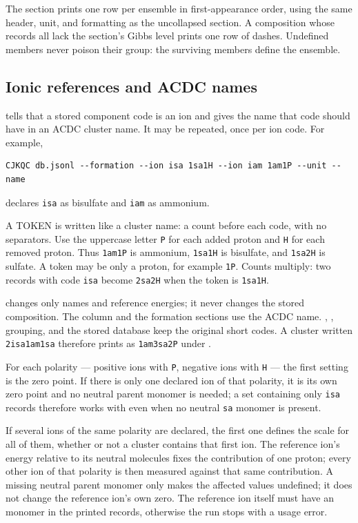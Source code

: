 The section prints one row per ensemble in first-appearance order, using the
same header, unit, and formatting as the uncollapsed section. A composition
whose records all lack the section's Gibbs level prints one row of dashes.
Undefined members never poison their group: the surviving members define the
ensemble.

\subsection{Ionic references and ACDC names}\label{sec:ion-references}

 tells \CJKQC{} that a stored component code is an
ion and gives the name that code should have in an ACDC cluster name. It may
be repeated, once per ion code. For example,

\begin{verbatim}
CJKQC db.jsonl --formation --ion isa 1sa1H --ion iam 1am1P --unit --name
\end{verbatim}

declares \texttt{isa} as bisulfate and \texttt{iam} as ammonium.

A TOKEN is written like a cluster name: a count before each code, with no
separators. Use the uppercase letter \texttt{P} for each added proton and
\texttt{H} for each removed proton. Thus \texttt{1am1P} is ammonium,
\texttt{1sa1H} is bisulfate, and \texttt{1sa2H} is sulfate. A token may be
only a proton, for example \texttt{1P}. Counts multiply: two records with
code \texttt{isa} become \texttt{2sa2H} when the token is
\texttt{1sa1H}.

 changes only names and reference energies; it never changes the
stored composition. The  column and the formation sections use
the ACDC name. , , grouping, and the
stored database keep the original short codes. A cluster written
\texttt{2isa1am1sa} therefore prints as \texttt{1am3sa2P} under
.

For each polarity — positive ions with \texttt{P}, negative ions with
\texttt{H} — the first  setting is the zero point. If there is
only one declared ion of that polarity, it is its own zero point and no
neutral parent monomer is needed; a set containing only \texttt{isa}
records therefore works with  even when no neutral
\texttt{sa} monomer is present.

If several ions of the same polarity are declared, the first one defines the
scale for all of them, whether or not a cluster contains that first ion. The
reference ion's energy relative to its neutral molecules fixes the
contribution of one proton; every other ion of that polarity is then
measured against that same contribution. A missing neutral parent monomer
only makes the affected values undefined; it does not change the reference
ion's own zero. The reference ion itself must have an  monomer in
the printed records, otherwise the run stops with a usage error.

